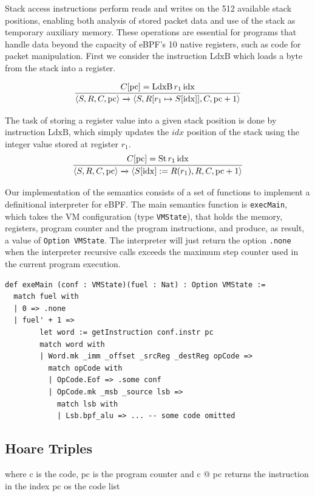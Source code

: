 \documentclass[sigconf]{acmart}
\begin{document}
Stack access instructions perform reads and writes on the 512 available stack positions, enabling both analysis of stored packet data and use of the stack as temporary auxiliary memory. These operations are essential for programs that handle data beyond the capacity of eBPF’s 10 native registers, such as code for packet manipulation. First we consider the instruction $\mathrm{LdxB}$ which loads a byte from the stack into a register.

\[
    \infer
        { \langle S, R, C, \mathrm{pc} \rangle \xrightarrow{} \langle S, R[r_1 \mapsto S[\mathrm{idx}]], C, \mathrm{pc} + 1 \rangle }
        { C[\mathrm{pc}] = \mathrm{LdxB} \, r_1 \, \mathrm{idx} }
\]

The task of storing a register value into a given stack position is done by instruction
$\mathrm{LdxB}$, which simply updates the $idx$ position of
the stack using the integer value stored at register $r_1$.
\[
    \infer
    { \langle S, R, C, \mathrm{pc} \rangle \xrightarrow{} \langle S[\mathrm{idx}] := R(r_1), R, C, \mathrm{pc} + 1 \rangle }
    { C[\mathrm{pc}] = \mathrm{St} \, r_1 \, \mathrm{idx} }
\]

Our implementation of the semantics consists of a set of functions to implement a definitional 
interpreter for eBPF. The main semantics function is \verb|execMain|, which takes the VM configuration
(type \verb|VMState|), that holds the memory, registers, program counter and the program instructions, 
and produce, as result, a value of \verb|Option VMState|. The interpreter will just return the option
\verb|.none| when the interpreter recursive calls exceeds the maximum step counter used in the 
current program execution.

\begin{verbatim}
def exeMain (conf : VMState)(fuel : Nat) : Option VMState :=
  match fuel with
  | 0 => .none
  | fuel' + 1 =>
        let word := getInstruction conf.instr pc
        match word with
        | Word.mk _imm _offset _srcReg _destReg opCode =>
          match opCode with
          | OpCode.Eof => .some conf
          | OpCode.mk _msb _source lsb =>
            match lsb with
            | Lsb.bpf_alu => ... -- some code omitted
\end{verbatim}

\subsection{Hoare Triples}
where c is the code, pc is the program counter and c @ pc returns the instruction in the index pc os the code list 
\end{document}
